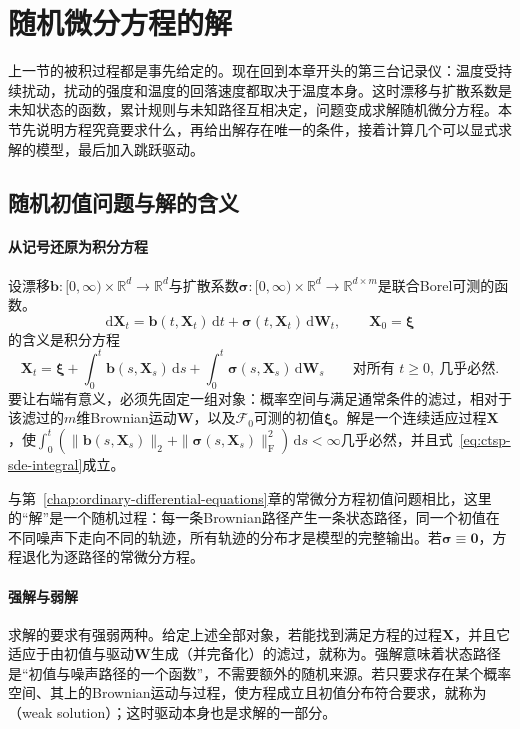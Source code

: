 \section{随机微分方程的解}
\label{sec:ctsp-sde}

上一节的被积过程都是事先给定的。现在回到本章开头的第三台记录仪：温度受持续扰动，扰动的强度和温度的回落速度都取决于温度本身。这时漂移与扩散系数是未知状态的函数，累计规则与未知路径互相决定，问题变成求解随机微分方程。本节先说明方程究竟要求什么，再给出解存在唯一的条件，接着计算几个可以显式求解的模型，最后加入跳跃驱动。

\subsection{随机初值问题与解的含义}
\label{sec:ctsp-sde-meaning}

\paragraph{从记号还原为积分方程}
设漂移$\bm b:[0,\infty)\times\mathbb R^d\to\mathbb R^d$与扩散系数$\bm\sigma:[0,\infty)\times\mathbb R^d\to\mathbb R^{d\times m}$是联合Borel可测的函数。
\begin{equation}
  \mathrm d\bm X_t=\bm b(t,\bm X_t)\,\mathrm dt+\bm\sigma(t,\bm X_t)\,\mathrm d\bm W_t,\qquad\bm X_0=\bm\xi
  \label{eq:ctsp-sde}
\end{equation}
的含义是积分方程
\begin{equation}
  \bm X_t=\bm\xi+\int_0^t\bm b(s,\bm X_s)\,\mathrm ds+\int_0^t\bm\sigma(s,\bm X_s)\,\mathrm d\bm W_s\qquad\text{对所有 }t\geq0,\ \text{几乎必然}.
  \label{eq:ctsp-sde-integral}
\end{equation}
要让右端有意义，必须先固定一组对象：概率空间与满足通常条件的滤过，相对于该滤过的$m$维Brownian运动$\bm W$，以及$\mathcal F_0$可测的初值$\bm\xi$。解是一个连续适应过程$\bm X$，使$\int_0^t(\|\bm b(s,\bm X_s)\|_2+\|\bm\sigma(s,\bm X_s)\|_{\mathrm F}^2)\,\mathrm ds<\infty$几乎必然，并且式~\eqref{eq:ctsp-sde-integral}成立。

与第~\ref{chap:ordinary-differential-equations}章的常微分方程初值问题相比，这里的“解”是一个随机过程：每一条Brownian路径产生一条状态路径，同一个初值在不同噪声下走向不同的轨迹，所有轨迹的分布才是模型的完整输出。若$\bm\sigma\equiv\bm0$，方程退化为逐路径的常微分方程。

\paragraph{强解与弱解}
求解的要求有强弱两种。给定上述全部对象，若能找到满足方程的过程$\bm X$，并且它适应于由初值与驱动$\bm W$生成（并完备化）的滤过，就称为。强解意味着状态路径是“初值与噪声路径的一个函数”，不需要额外的随机来源。若只要求存在某个概率空间、其上的Brownian运动与过程，使方程成立且初值分布符合要求，就称为（weak solution）；这时驱动本身也是求解的一部分。

